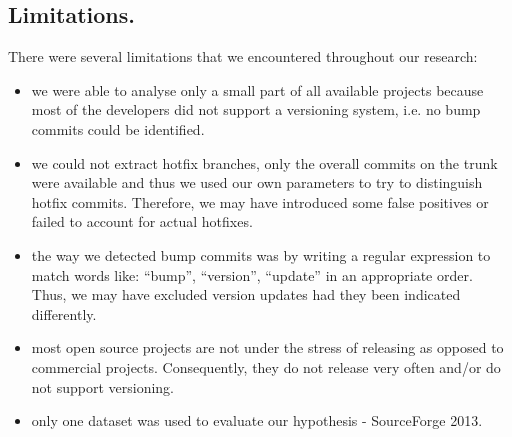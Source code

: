 \subsection{Limitations.}
There were several limitations that we encountered throughout our research:
\begin{itemize}
  \item we were able to analyse only a small part of all available projects because most of the developers did not support a versioning system, i.e. no bump commits could be identified.
  \item we could not extract hotfix branches, only the overall commits on the trunk were available and thus we used our own parameters to try to distinguish hotfix commits. Therefore, we may have introduced some false positives or failed to account for actual hotfixes.
  \item the way we detected bump commits was by writing a regular expression to match words like:  ``bump'', ``version'', ``update'' in an appropriate order. Thus, we may have excluded version updates had they been indicated differently. 
  \item most open source projects are not under the stress of releasing as opposed to commercial projects. Consequently, they do not release very often and/or do not support versioning.
  \item only one dataset was used to evaluate our hypothesis - SourceForge 2013.
\end{itemize}


